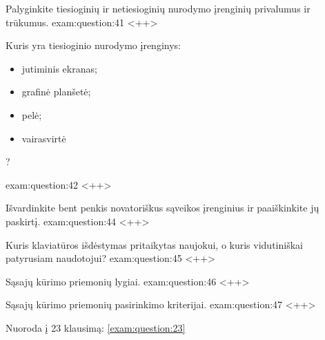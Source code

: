 
\begin{question}{%
  Palyginkite tiesioginių ir netiesioginių nurodymo įrenginių privalumus
  ir trūkumus.
  }{exam:question:41}
  <++>
\end{question}

\begin{question}{%
  Kuris yra tiesioginio nurodymo įrenginys:
  \begin{itemize}
    \item jutiminis ekranas;
    \item grafinė planšetė;
    \item pelė;
    \item vairasvirtė
  \end{itemize}
  ?
  }{exam:question:42}
  <++>
\end{question}

\begin{question}{%
  Išvardinkite bent penkis novatoriškus sąveikos įrenginius ir
  paaiškinkite jų paskirtį.
  }{exam:question:44}
  <++>
\end{question}

\begin{question}{%
  Kuris klaviatūros išdėstymas pritaikytas naujokui, o kuris vidutiniškai
  patyrusiam naudotojui?
  }{exam:question:45}
  <++>
\end{question}

\begin{question}{%
  Sąsajų kūrimo priemonių lygiai.
  }{exam:question:46}
  <++>
\end{question}

\begin{question}{%
  Sąsajų kūrimo priemonių pasirinkimo kriterijai.
  }{exam:question:47}
  <++>
\end{question}

Nuoroda į 23 klausimą: \ref{exam:question:23}
